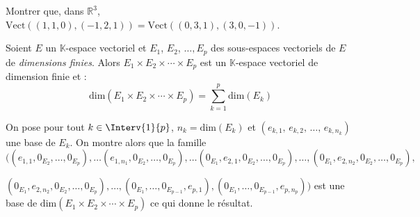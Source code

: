 \documentclass[a4paper,10pt]{report}
\begin{document}
\begin{ApplicationDirecte} Montrer que, dans $\mathbb{R}^3$, $\textrm{Vect}((1,1,0), (-1,2,1))= \textrm{Vect}((0,3,1), (3,0,-1))$.
\end{ApplicationDirecte}

\begin{Proposition}{}
Soient $E$ un $\mathbb{K}$-espace vectoriel et $E_1$, $E_2$, $\ldots, E_p$ des sous-espaces vectoriels de $E$ de \emph{dimensions finies}. Alors $E_1 \times E_2 \times \cdots \times E_p$ est un $\mathbb{K}$-espace vectoriel de dimension finie et :
$$ \textrm{dim}(E_1 \times E_2 \times \cdots \times E_p) = \sum_{k=1}^p \textrm{dim} (E_k)$$
\end{Proposition}

\begin{Demonstration}{} On pose pour tout $k \in \Interv{1}{p}$, $n_k = \textrm{dim} (E_k)$ et $(e_{k,1}, \, e_{k,2}, \, \ldots, \, e_{k,n_k})$ une base de $E_k$. On montre alors que la famille $((e_{1,1}, 0_{E_2}, \ldots, 0_{E_p}), \ldots (e_{1,n_1}, 0_{E_2}, \ldots, 0_{E_p}), \ldots (0_{E_1},e_{2,1}, 0_{E_2}, \ldots, 0_{E_p}), \ldots,(0_{E_1},e_{2,n_2}, 0_{E_2}, \ldots,0_{E_p}),$

$(0_{E_1},e_{2,n_2}, 0_{E_2}, \ldots,0_{E_p}), \ldots, (0_{E_1},\ldots, 0_{E_{p-1}}, e_{p,1}), (0_{E_1},\ldots, 0_{E_{p-1}}, e_{p,n_p}))$ est une base de $\textrm{dim}(E_1 \times E_2 \times \cdots \times E_p)$ ce qui donne le résultat.
\end{Demonstration}

\medskip

\end{document}
